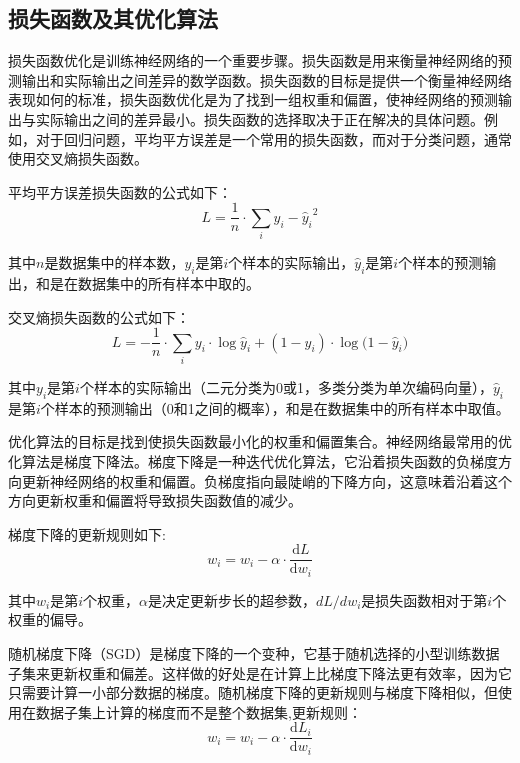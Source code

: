 \subsection{损失函数及其优化算法}

损失函数优化是训练神经网络的一个重要步骤。损失函数是用来衡量神经网络的预测输出和实际输出之间差异的数学函数。损失函数的目标是提供一个衡量神经网络表现如何的标准，损失函数优化是为了找到一组权重和偏置，使神经网络的预测输出与实际输出之间的差异最小。损失函数的选择取决于正在解决的具体问题。例如，对于回归问题，平均平方误差是一个常用的损失函数，而对于分类问题，通常使用交叉熵损失函数。

平均平方误差损失函数的公式如下：
\begin{equation}
\label{eq:2_18}
L = \frac{1}{n} \cdot \sum _i{y_i - \hat y_{i}}^2
\end{equation}

其中$n$是数据集中的样本数，$y_i$是第$i$个样本的实际输出，$\hat y_{i}$是第$i$个样本的预测输出，和是在数据集中的所有样本中取的。

交叉熵损失函数的公式如下：
\begin{equation}
\label{eq:2_19}
L = - \frac{1}{n} \cdot \sum _i{y_i \cdot \log{\hat y_i} + (1 - y_i) \cdot \log{(1 -\hat y_i})}
\end{equation}

其中$y_i$是第$i$个样本的实际输出（二元分类为0或1，多类分类为单次编码向量），$\hat y_i$是第$i$个样本的预测输出（0和1之间的概率），和是在数据集中的所有样本中取值。

优化算法的目标是找到使损失函数最小化的权重和偏置集合。神经网络最常用的优化算法是梯度下降法。梯度下降是一种迭代优化算法，它沿着损失函数的负梯度方向更新神经网络的权重和偏置。负梯度指向最陡峭的下降方向，这意味着沿着这个方向更新权重和偏置将导致损失函数值的减少。

梯度下降的更新规则如下:
\begin{equation}
\label{eq:2_20}
w_i = w_i - \alpha \cdot \frac{\mathrm{d}{L}}{\mathrm{d}{w_i}}
\end{equation}


其中$w_i$是第$i$个权重，$\alpha$是决定更新步长的超参数，$dL/dw_i$是损失函数相对于第$i$个权重的偏导。


随机梯度下降（SGD）是梯度下降的一个变种，它基于随机选择的小型训练数据子集来更新权重和偏差。这样做的好处是在计算上比梯度下降法更有效率，因为它只需要计算一小部分数据的梯度。随机梯度下降的更新规则与梯度下降相似，但使用在数据子集上计算的梯度而不是整个数据集,更新规则：
\begin{equation}
\label{eq:2_21}
w_i = w_i - \alpha \cdot \frac{\mathrm{d}{L_i}}{\mathrm{d}{w_i}}
\end{equation}

